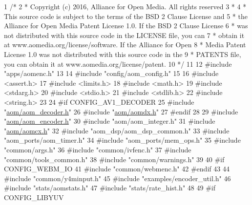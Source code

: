 \begin{DoxyCodeInclude}
1 \textcolor{comment}{/*}
2 \textcolor{comment}{ * Copyright (c) 2016, Alliance for Open Media. All rights reserved}
3 \textcolor{comment}{ *}
4 \textcolor{comment}{ * This source code is subject to the terms of the BSD 2 Clause License and}
5 \textcolor{comment}{ * the Alliance for Open Media Patent License 1.0. If the BSD 2 Clause License}
6 \textcolor{comment}{ * was not distributed with this source code in the LICENSE file, you can}
7 \textcolor{comment}{ * obtain it at www.aomedia.org/license/software. If the Alliance for Open}
8 \textcolor{comment}{ * Media Patent License 1.0 was not distributed with this source code in the}
9 \textcolor{comment}{ * PATENTS file, you can obtain it at www.aomedia.org/license/patent.}
10 \textcolor{comment}{ */}
11 
12 \textcolor{preprocessor}{#include "apps/aomenc.h"}
13 
14 \textcolor{preprocessor}{#include "config/aom\_config.h"}
15 
16 \textcolor{preprocessor}{#include <assert.h>}
17 \textcolor{preprocessor}{#include <limits.h>}
18 \textcolor{preprocessor}{#include <math.h>}
19 \textcolor{preprocessor}{#include <stdarg.h>}
20 \textcolor{preprocessor}{#include <stdio.h>}
21 \textcolor{preprocessor}{#include <stdlib.h>}
22 \textcolor{preprocessor}{#include <string.h>}
23 
24 \textcolor{preprocessor}{#if CONFIG\_AV1\_DECODER}
25 \textcolor{preprocessor}{#include "\hyperlink{aom__decoder_8h}{aom/aom\_decoder.h}"}
26 \textcolor{preprocessor}{#include "\hyperlink{aomdx_8h}{aom/aomdx.h}"}
27 \textcolor{preprocessor}{#endif}
28 
29 \textcolor{preprocessor}{#include "\hyperlink{aom__encoder_8h}{aom/aom\_encoder.h}"}
30 \textcolor{preprocessor}{#include "aom/aom\_integer.h"}
31 \textcolor{preprocessor}{#include "\hyperlink{aomcx_8h}{aom/aomcx.h}"}
32 \textcolor{preprocessor}{#include "aom\_dsp/aom\_dsp\_common.h"}
33 \textcolor{preprocessor}{#include "aom\_ports/aom\_timer.h"}
34 \textcolor{preprocessor}{#include "aom\_ports/mem\_ops.h"}
35 \textcolor{preprocessor}{#include "common/args.h"}
36 \textcolor{preprocessor}{#include "common/ivfenc.h"}
37 \textcolor{preprocessor}{#include "common/tools\_common.h"}
38 \textcolor{preprocessor}{#include "common/warnings.h"}
39 
40 \textcolor{preprocessor}{#if CONFIG\_WEBM\_IO}
41 \textcolor{preprocessor}{#include "common/webmenc.h"}
42 \textcolor{preprocessor}{#endif}
43 
44 \textcolor{preprocessor}{#include "common/y4minput.h"}
45 \textcolor{preprocessor}{#include "examples/encoder\_util.h"}
46 \textcolor{preprocessor}{#include "stats/aomstats.h"}
47 \textcolor{preprocessor}{#include "stats/rate\_hist.h"}
48 
49 \textcolor{preprocessor}{#if CONFIG\_LIBYUV}

\end{DoxyCodeInclude}
